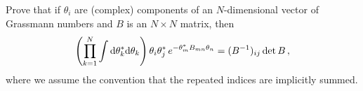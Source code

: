 \begin{ex} \label{ex_26} 
    Prove that if $\theta_{i}$ are (complex) components of an $N$-dimensional vector of Grassmann numbers
    and $B$ is an $N \times N$ matrix, then
    \begin{equation}
        \left(\prod_{k=1}^{N} \int {\rm d} \theta_k^{*} {\rm d} \theta_k \right) \theta_{i}\theta_{j}^* \, e^{- \theta_{m}^{*}B_{mn}\theta_{n}} = (B^{-1})_{ij} \det B\, ,
        \label{Eq_Ex26_request}
    \end{equation}
    where we assume the convention that the repeated indices are implicitly summed.
\end{ex}



